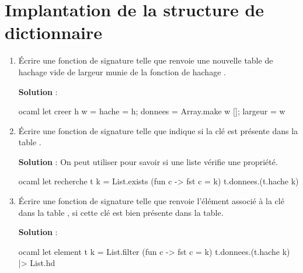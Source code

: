 \documentclass[10pt,a4paper, varwidth]{article}
\begin{document}
	\section{Implantation de la structure de dictionnaire}
	\begin{enumerate}
		\item Écrire une fonction  de signature 
		telle que  renvoie une nouvelle table de hachage vide de largeur  munie de la fonction de
		hachage .
        \if{}
        \begin{emphase}
            \textbf{Solution} : 
            \begin{center}
\begin{code}{ocaml}
let creer h w =
    {hache = h; donnees = Array.make w []; largeur = w}
\end{code}
            \end{center}
        \end{emphase}
        \fi
		\item Écrire une fonction  de signature  telle que 
		indique si la clé  est présente dans la table .
		\if{}
        \begin{emphase}
            \textbf{Solution} : On peut utiliser  pour savoir si une liste vérifie une propriété.
            \begin{center}
\begin{code}{ocaml}
let recherche t k =
    List.exists (fun c -> fst c = k) t.donnees.(t.hache k) 
\end{code}
            \end{center}
        \end{emphase}
        \fi
        \item Écrire une fonction  de signature  telle que  renvoie
		l'élément associé à la clé  dans la table , si cette clé est bien présente dans la table.
        \if{}
        \begin{emphase}
            \textbf{Solution} : 
            \begin{center}
\begin{code}{ocaml}
let element t k =
    List.filter (fun c -> fst c  = k) t.donnees.(t.hache k)
    |> List.hd 
\end{code}

\end{center}
\end{emphase}
\end{enumerate}
\end{document}
